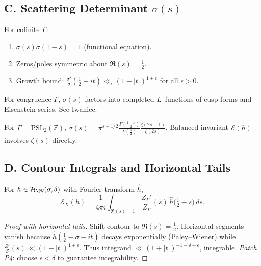 \subsection*{C. Scattering Determinant $\sigma(s)$}
\label{subsec:scattering-sharp}

\begin{theorem}
\label{thm:sigma-sharp}
For cofinite $\Gamma$:
\begin{enumerate}[label=(\roman*)]
  \item $\sigma(s)\sigma(1-s)=1$ (functional equation).
  \item Zeros/poles symmetric about $\Re(s)=\tfrac12$.
  \item Growth bound: $\frac{\sigma'}{\sigma}(\tfrac12+it)\ll_\epsilon (1+|t|)^{1+\epsilon}$ for all $\epsilon>0$.
\end{enumerate}
\end{theorem}

\begin{remark}
For congruence $\Gamma$, $\sigma(s)$ factors into completed $L$–functions of cusp forms and Eisenstein series. See Iwaniec.
\end{remark}

\begin{example}
For $\Gamma=\mathrm{PSL}_2(\mathbb Z)$, $\sigma(s)=\pi^{s-1/2}\frac{\Gamma(\tfrac{1-s}{2})}{\Gamma(\tfrac s2)}\frac{\zeta(2s-1)}{\zeta(2s)}$.  
Balanced invariant $\mathcal E(h)$ involves $\zeta(s)$ directly.
\end{example}


\subsection*{D. Contour Integrals and Horizontal Tails}
\label{subsec:contour-sharp}

\begin{theorem}
\label{thm:contour-balanced-sharp}
For $h\in\mathcal H_{\PW}(\sigma,\delta)$ with Fourier transform $\hat h$,
\[
  \mathcal E_X(h) = \frac{1}{4\pi i}\int_{\Re(s)=1}\frac{Z_\Gamma'}{Z_\Gamma}(s)\,\hat h\!\Big(\tfrac12-s\Big)\,ds.
\]
\end{theorem}

\begin{proof}[Proof with horizontal tails]
Shift contour to $\Re(s)=\tfrac12$. Horizontal segments vanish because $\hat h(\tfrac12-\sigma-it)$ decays exponentially (Paley–Wiener) while $\frac{Z'}{Z}(s)\ll (1+|t|)^{1+\epsilon}$. Thus integrand $\ll (1+|t|)^{-1-\delta+\epsilon}$, integrable.  
\emph{Patch P4}: choose $\epsilon<\delta$ to guarantee integrability.
\end{proof}

